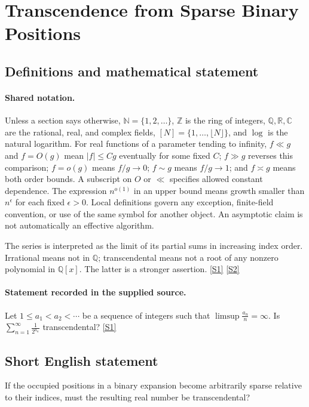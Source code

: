 \documentclass[11pt,a4paper]{article}
\newcommand{\N}{\mathbb{N}}
\newcommand{\Z}{\mathbb{Z}}
\newcommand{\Q}{\mathbb{Q}}
\newcommand{\R}{\mathbb{R}}
\newcommand{\C}{\mathbb{C}}
\newcommand{\sref}[2]{\hyperlink{source:#1:#2}{[S#2]}}
\begin{document}
\section{Transcendence from Sparse Binary Positions}\label{statement}


\subsection{Definitions and mathematical statement}

\paragraph{Shared notation.}Unless a section says otherwise, $\N=\{1,2,\ldots\}$,
$\Z$ is the ring of integers, $\Q,\R,\C$ are the rational, real, and complex
fields, $[N]=\{1,\ldots,\lfloor N\rfloor\}$, and $\log$ is the natural
logarithm. For real functions of a parameter tending to infinity,
$f\ll g$ and $f=O(g)$ mean $|f|\leq Cg$ eventually for some fixed $C$;
$f\gg g$ reverses this comparison; $f=o(g)$ means $f/g\to0$;
$f\sim g$ means $f/g\to1$; and $f\asymp g$ means both order bounds.
A subscript on $O$ or $\ll$ specifies allowed constant dependence.
The expression $n^{o(1)}$ in an upper bound means growth smaller than
$n^\epsilon$ for each fixed $\epsilon>0$. Local definitions govern any
exception, finite-field convention, or use of the same symbol for another
object. An asymptotic claim is not automatically an effective algorithm.



The series is interpreted as the limit of its partial sums in increasing index order. Irrational means not in $\Q$; transcendental means not a root of any nonzero polynomial in $\Q[x]$. The latter is a stronger assertion. \sref{statement}{1} \sref{statement}{2}

\paragraph{Statement recorded in the supplied source.}
Let $1\leq a_1<a_2<\cdots$ be a sequence of integers such that $ \limsup \frac{a_n}{n}=\infty. $ Is $ \sum_{n=1}^\infty \frac{1}{2^{a_n}} $ transcendental? \sref{statement}{1}

\subsection{Short English statement}

If the occupied positions in a binary expansion become arbitrarily sparse relative to their indices, must the resulting real number be transcendental?
\end{document}
